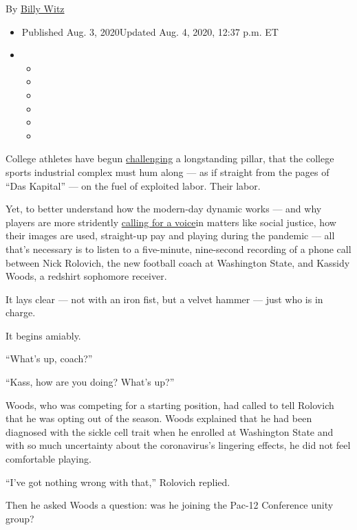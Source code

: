By \href{https://www.nytimes.com/by/billy-witz}{Billy Witz}

\begin{itemize}
\item
  Published Aug. 3, 2020Updated Aug. 4, 2020, 12:37 p.m. ET
\item
  \begin{itemize}
  \item
  \item
  \item
  \item
  \item
  \item
  \end{itemize}
\end{itemize}

College athletes have begun
\href{https://www.nytimes.com/2020/06/12/sports/ncaafootball/george-floyd-protests-college-sports.html}{challenging}
a longstanding pillar, that the college sports industrial complex must
hum along --- as if straight from the pages of ``Das Kapital'' --- on
the fuel of exploited labor. Their labor.

Yet, to better understand how the modern-day dynamic works --- and why
players are more stridently
\href{https://www.nytimes.com/2020/08/02/sports/ncaafootball/coronavirus-college-football-pac-12.html}{calling
for a voice}in matters like social justice, how their images are used,
straight-up pay and playing during the pandemic --- all that's necessary
is to listen to a five-minute, nine-second recording of a phone call
between Nick Rolovich, the new football coach at Washington State, and
Kassidy Woods, a redshirt sophomore receiver.

It lays clear --- not with an iron fist, but a velvet hammer --- just
who is in charge.

It begins amiably.

``What's up, coach?''

``Kass, how are you doing? What's up?''

Woods, who was competing for a starting position, had called to tell
Rolovich that he was opting out of the season. Woods explained that he
had been diagnosed with the sickle cell trait when he enrolled at
Washington State and with so much uncertainty about the coronavirus's
lingering effects, he did not feel comfortable playing.

``I've got nothing wrong with that,'' Rolovich replied.

Then he asked Woods a question: was he joining the Pac-12 Conference
unity group?

